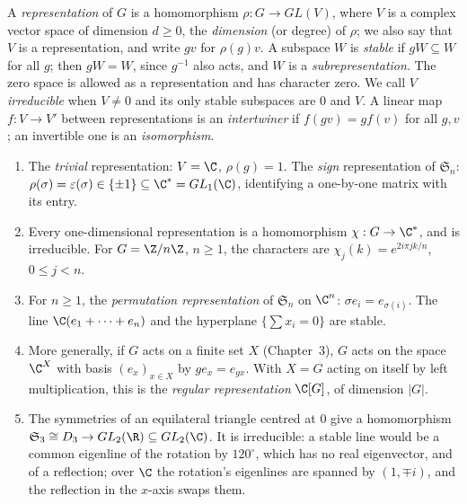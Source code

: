\begin{definition}
A \emph{representation} of $G$ is a homomorphism $\rho:G\to GL(V)$, where $V$ is a complex vector space of dimension $d\ge0$, the \emph{dimension} (or degree) of $\rho$; we also say that $V$ is a representation, and write $gv$ for $\rho(g)v$. A subspace $W$ is \emph{stable} if $gW\subseteq W$ for all $g$; then $gW=W$, since $g^{-1}$ also acts, and $W$ is a \emph{subrepresentation}. The zero space is allowed as a representation and has character zero. We call $V$ \emph{irreducible} when $V\ne0$ and its only stable subspaces are $0$ and $V$. A linear map $f:V\to V'$ between representations is an \emph{intertwiner} if $f(gv)=gf(v)$ for all $g,v$; an invertible one is an \emph{isomorphism}.
\end{definition}

\begin{example}\label{ex:reps}
\begin{enumerate}[label=(\arabic*)]
\item The \emph{trivial} representation: $V=\C$, $\rho(g)=1$. The \emph{sign} representation of $\mathfrak S_n$: $\rho(\sigma)=\varepsilon(\sigma)\in\{\pm1\}\subseteq\C^*=GL_1(\C)$, identifying a one-by-one matrix with its entry.
\item Every one-dimensional representation is a homomorphism $\chi:G\to\C^*$, and is irreducible. For $G=\Z/n\Z$, $n\ge1$, the characters are $\chi_j(k)=e^{2i\pi jk/n}$, $0\le j<n$.
\item For $n\ge1$, the \emph{permutation representation} of $\mathfrak S_n$ on $\C^n$: $\sigma e_i=e_{\sigma(i)}$. The line $\C(e_1+\dots+e_n)$ and the hyperplane $\{\sum x_i=0\}$ are stable.
\item More generally, if $G$ acts on a finite set $X$ (Chapter~3), $G$ acts on the space $\C^X$ with basis $(e_x)_{x\in X}$ by $ge_x=e_{gx}$. With $X=G$ acting on itself by left multiplication, this is the \emph{regular representation} $\C[G]$, of dimension $|G|$.
\item The symmetries of an equilateral triangle centred at $0$ give a homomorphism $\mathfrak S_3\cong D_3\to GL_2(\R)\subseteq GL_2(\C)$. It is irreducible: a stable line would be a common eigenline of the rotation by $120^\circ$, which has no real eigenvector, and of a reflection; over $\C$ the rotation's eigenlines are spanned by $(1,\mp i)$, and the reflection in the $x$-axis swaps them.
\end{enumerate}
\end{example}

